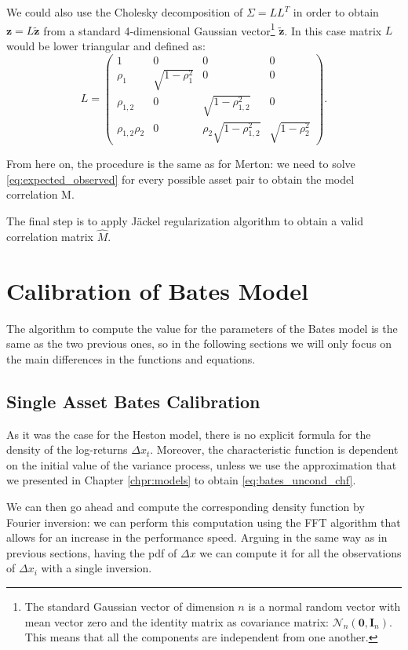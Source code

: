 We could also use the Cholesky decomposition of $\Sigma = L L^T$ in order to obtain $\mathbf{z} = L \mathbf{\tilde{z}}$ from a standard 4-dimensional Gaussian vector\footnote{The standard Gaussian vector of dimension $n$ is a normal random vector with mean vector zero and the identity matrix as covariance matrix: $\mathcal{N}_n (\mathbf{0}, \mathbf{I}_n)$. This means that all the components are independent from one another.} $\mathbf{\tilde{z}}$. In this case matrix $L$ would be lower triangular and defined as:
\begin{equation}
	L = \begin{pmatrix}
	1&0&0&0\\
	\rho_1 & \sqrt{1- \rho_1^2} &0&0\\
	\rho_{1,2} &0&\sqrt{1-\rho_{1,2}^2}&0\\
	\rho_{1,2}\rho_2 & 0& \rho_2 \sqrt{1-\rho_{1,2}^2}&\sqrt{1- \rho_2^2} 
	\end{pmatrix}.
\end{equation}

From here on, the procedure is the same as for Merton:
we need to solve \eqref{eq:expected_observed} for every possible asset pair to obtain the model correlation M.

The final step is to apply  J\"ackel regularization algorithm to obtain a valid correlation matrix $\widehat{M}$.

\bigskip
\section{Calibration of Bates Model}
\label{sec:bates_cal}
The algorithm to compute the value for the parameters of the Bates model is the same as the two previous ones, so in the following sections we will only focus on the main differences in the functions and equations.

\subsection{Single Asset Bates Calibration}
As it was the case for the Heston model, there is no explicit formula for the density of the log-returns $\Delta x_t$. Moreover, the characteristic function is dependent on the initial value of the variance process, unless we use the approximation that we presented in Chapter \ref{chpr:models} to obtain \eqref{eq:bates_uncond_chf}.

We can then go ahead and compute the corresponding density function by Fourier inversion: we can perform this computation using the FFT algorithm that allows for an increase in the performance speed. 
Arguing in the same way as in previous sections, having the pdf of $\Delta x$ we can compute it for all the observations of $\Delta x_i$ with a single inversion.

